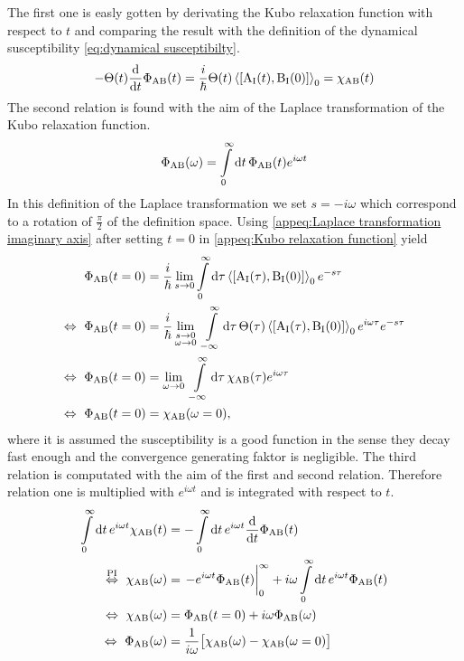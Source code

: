 The first one is easly gotten by derivating the Kubo relaxation function with respect to $t$ and comparing the result with the definition of the dynamical susceptibility \eqref{eq:dynamical susceptibilty}.
%
\begin{align}
	-\Theta(t) \dv{t} \Phi_{\mt{AB}}(t) = \frac{i}{\hbar} \Theta(t) \expval{\comm{\mt{A}_{\mt{I}}(t)}{\mt{B}_{\mt{I}}(0)}}_{0} = \chi_{\mt{AB}}(t)
\end{align}
%
The second relation is found with the aim of the Laplace transformation of the Kubo relaxation function.
%
\begin{align}
	\Phi_{\mathrm{AB}}(\omega) = \int\limits_{0}^{\infty} \dd{t} \Phi_{\mathrm{AB}}(t) e^{i\omega t}
	\label{appeq:Laplace transformation imaginary axis}
\end{align}
%
In this definition of the Laplace transformation we set $s = -i\omega$ which correspond to a rotation of $\frac{\pi}{2}$ of the definition space.
Using \eqref{appeq:Laplace transformation imaginary axis} after setting $t = 0$ in \eqref{appeq:Kubo relaxation function} yield
%
\begin{align}
	\Phi_{\mt{AB}}(t=0) &= \frac{i}{\hbar} \lim\limits_{s \to 0} \int\limits_{0}^{\infty} \dd{\tau} \expval{\comm{\mt{A}_{\mt{I}}(\tau)}{\mt{B}_{\mt{I}}(0)}}_{0} e^{-s\tau}
	\notag \\
	\Leftrightarrow\ \Phi_{\mt{AB}}(t=0) &= \frac{i}{\hbar} \lim\limits_{\substack{s \to 0 \\ \omega \to 0}}\ \int\limits_{-\infty}^{\infty} \dd{\tau} \Theta(\tau) \expval{\comm{\mt{A}_{\mt{I}}(\tau)}{\mt{B}_{\mt{I}}(0)}}_{0} e^{i\omega \tau} e^{-s\tau}
	\notag \\
	\Leftrightarrow\ \Phi_{\mt{AB}}(t=0) &= \lim\limits_{\omega \to 0}\ \int\limits_{-\infty}^{\infty} \dd{\tau} \chi_{\mt{AB}}(\tau) e^{i\omega \tau}
	\notag \\
	\Leftrightarrow\ \Phi_{\mt{AB}}(t=0) &= \chi_{\mt{AB}}(\omega = 0),
\end{align}
%
where it is assumed the susceptibility is a good function in the sense they decay fast enough and the convergence generating faktor is negligible.
The third relation is computated with the aim of the first and second relation.
Therefore relation one is multiplied with $e^{i\omega t}$ and is integrated with respect to $t$.
%
\begin{align}
	\int\limits_{0}^{\infty} \dd{t} e^{i\omega t} \chi_{\mt{AB}}(t)  &= - \int\limits_{0}^{\infty} \dd{t} e^{i\omega t} \dv{t} \Phi_{\mt{AB}}(t)
	\notag \\
	\overset{\mt{PI}}{\Leftrightarrow}\ \chi_{\mt{AB}}(\omega) &= \eval{-e^{i\omega t} \Phi_{\mt{AB}}(t)}_{0}^{\infty} + i\omega \int\limits_{0}^{\infty} \dd{t} e^{i\omega t} \Phi_{\mt{AB}}(t)
	\notag \\
	\Leftrightarrow\ \chi_{\mt{AB}}(\omega) &= \Phi_{\mt{AB}}(t=0) + i\omega \Phi_{\mt{AB}}(\omega)
	\notag \\
	\Leftrightarrow\ \Phi_{\mt{AB}}(\omega) &= \frac{1}{i\omega} \big[\chi_{\mt{AB}}(\omega) - \chi_{\mt{AB}}(\omega=0)\big]
\end{align}
